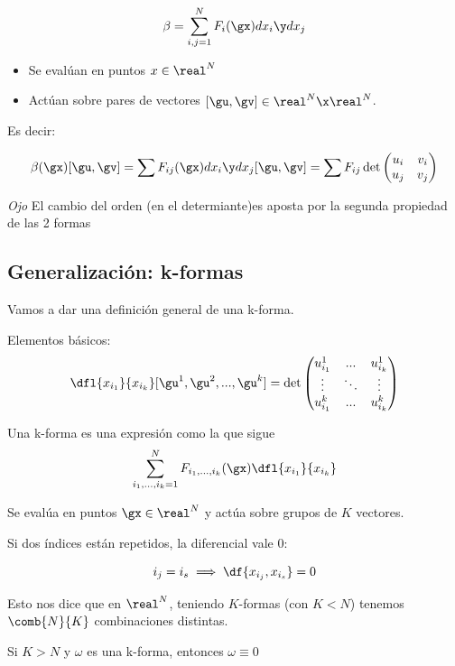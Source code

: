 \begin{defn}[2-forma]
\[\beta = \sum_{i,j=1}^N F_i(\gx) dx_i\y dx_j\]
\begin{itemize}
\item Se evalúan en puntos $x\in\real^N$
\item Actúan sobre pares de vectores $[\gu,\gv]\in\real^N\x\real^N$.
\end{itemize}

Es decir:

\[\beta(\gx)[\gu,\gv] = \sum F_{ij}(\gx) dx_i\y dx_j[\gu,\gv] = \sum F_{ij} \det \begin{pmatrix}
u_i&v_i\\u_j&v_j
\end{pmatrix}\]

\emph{Ojo} El cambio del orden (en el determiante)es aposta por la segunda propiedad de las 2 formas
\end{defn}


\subsection{Generalización: k-formas}
Vamos a dar una definición general de una k-forma.

Elementos básicos:
\[\dfl{x_{i_1}}{x_{i_k}}[\gu^1,\gu^2,...,\gu^k] = \det\begin{pmatrix}
u_{i_1}^1 & ... & u_{i_k}^1\\
\vdots & \ddots & \vdots\\
u_{i_1}^k & ... & u_{i_k}^k
\end{pmatrix}\]

\begin{defn}[K-forma] Una k-forma es una expresión como la que sigue
\[
\sum_{i_1,...,i_k=1}^N F_{i_1,...,i_k}(\gx)\dfl{x_{i_1}}{x_{i_k}}
\]

Se evalúa en puntos $\gx\in\real^N$ y actúa sobre grupos de $K$ vectores.
\end{defn}

\begin{lemma} Si dos índices están repetidos, la diferencial vale 0:

\[ i_j = i_s \implies \df{x_{i_j},x_{i_s}} = 0 \]

\end{lemma}

Esto nos dice que en $\real^N$, teniendo $K$-formas (con $K<N$) tenemos $\comb{N}{K}$ combinaciones distintas.

\obs Si $K>N$ y $\omega$ es una k-forma, entonces $\omega \equiv 0$


